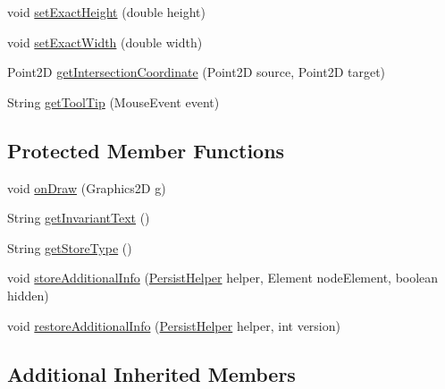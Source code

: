 \begin{DoxyCompactItemize}
\item 
void \hyperlink{classorg_1_1tzi_1_1use_1_1gui_1_1views_1_1diagrams_1_1statemachine_1_1_state_node_a91a1e0dc2bbf19d16146b90170015061}{set\-Exact\-Height} (double height)
\item 
void \hyperlink{classorg_1_1tzi_1_1use_1_1gui_1_1views_1_1diagrams_1_1statemachine_1_1_state_node_a07156a2300a7ec5eb6f6724087ca7af1}{set\-Exact\-Width} (double width)
\item 
Point2\-D \hyperlink{classorg_1_1tzi_1_1use_1_1gui_1_1views_1_1diagrams_1_1statemachine_1_1_state_node_a6e5658fec9e642879867516155388142}{get\-Intersection\-Coordinate} (Point2\-D source, Point2\-D target)
\item 
String \hyperlink{classorg_1_1tzi_1_1use_1_1gui_1_1views_1_1diagrams_1_1statemachine_1_1_state_node_afbe9e7cc32acd092d648548cee7be60a}{get\-Tool\-Tip} (Mouse\-Event event)
\end{DoxyCompactItemize}
\subsection*{Protected Member Functions}
\begin{DoxyCompactItemize}
\item 
void \hyperlink{classorg_1_1tzi_1_1use_1_1gui_1_1views_1_1diagrams_1_1statemachine_1_1_state_node_ac67b9ee15cfd7c7bdb3c6f8449964e2f}{on\-Draw} (Graphics2\-D g)
\item 
String \hyperlink{classorg_1_1tzi_1_1use_1_1gui_1_1views_1_1diagrams_1_1statemachine_1_1_state_node_a430899f8b3c924b55c6fbe88c261b58b}{get\-Invariant\-Text} ()
\item 
String \hyperlink{classorg_1_1tzi_1_1use_1_1gui_1_1views_1_1diagrams_1_1statemachine_1_1_state_node_a0e64d57c2d03c9a61490d730b94a05a1}{get\-Store\-Type} ()
\item 
void \hyperlink{classorg_1_1tzi_1_1use_1_1gui_1_1views_1_1diagrams_1_1statemachine_1_1_state_node_a8f147a0cfb630c6802ec3fd241dcdc6f}{store\-Additional\-Info} (\hyperlink{classorg_1_1tzi_1_1use_1_1gui_1_1util_1_1_persist_helper}{Persist\-Helper} helper, Element node\-Element, boolean hidden)
\item 
void \hyperlink{classorg_1_1tzi_1_1use_1_1gui_1_1views_1_1diagrams_1_1statemachine_1_1_state_node_a6fbb5daf195840e9761dfd8fda9bec1a}{restore\-Additional\-Info} (\hyperlink{classorg_1_1tzi_1_1use_1_1gui_1_1util_1_1_persist_helper}{Persist\-Helper} helper, int version)
\end{DoxyCompactItemize}
\subsection*{Additional Inherited Members}


